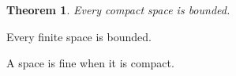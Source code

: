 \documentclass{article}
\newtheorem{thm}{Theorem}
\begin{document}
\begin{thm} Every compact space is bounded. \end{thm}
\begin{cor} Every finite space is bounded. \end{cor}
\begin{defn} A space is fine when it is compact. \end{defn}
\end{document}
